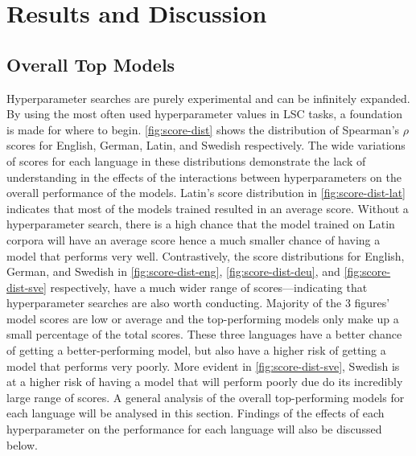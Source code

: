 \section{Results and Discussion}
\label{sec:results}

\subsection{Overall Top Models}

Hyperparameter searches are purely experimental and can be infinitely expanded. By using the most often used hyperparameter values in LSC tasks, a foundation is made for where to begin. \autoref{fig:score-dist} shows the distribution of Spearman's $\rho$ scores for English, German, Latin, and Swedish respectively. The wide variations of scores for each language in these distributions demonstrate the lack of understanding in the effects of the interactions between hyperparameters on the overall performance of the models. Latin's score distribution in \autoref{fig:score-dist-lat} indicates that most of the models trained resulted in an average score. Without a hyperparameter search, there is a high chance that the model trained on Latin corpora will have an average score hence a much smaller chance of having a model that performs very well. Contrastively, the score distributions for English, German, and Swedish in  \autoref{fig:score-dist-eng}, \autoref{fig:score-dist-deu}, and \autoref{fig:score-dist-sve} respectively, have a much wider range of scores⁠⁠—indicating that hyperparameter searches are also worth conducting. Majority of the 3 figures' model scores are low or average and the top-performing models only make up a small percentage of the total scores. These three languages have a better chance of getting a better-performing model, but also have a higher risk of getting a model that performs very poorly. More evident in \autoref{fig:score-dist-sve}, Swedish is at a higher risk of having a model that will perform poorly due do its incredibly large range of scores. A general analysis of the overall top-performing models for each language will be analysed in this section. Findings of the effects of each hyperparameter on the performance for each language will also be discussed below. 

